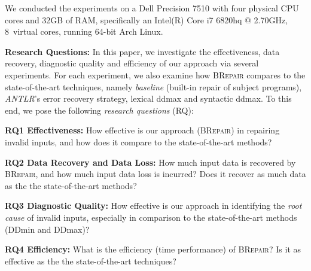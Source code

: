 \documentclass[sigconf,review,anonymous]{acmart}
\newcommand{\recheck}[1]{\textcolor{red}{#1}}
\newcommand{\revise}[1]{\textcolor{blue}{#1}}
\newcommand{\approach}{\textsc{BRepair}\xspace}
\begin{document}
We conducted the experiments on a Dell Precision 7510 
with four physical CPU cores %
and 32GB of RAM, specifically an Intel(R) Core i7 6820hq @ 2.70GHz, 8~virtual cores, running 64-bit Arch Linux.


\smallskip\noindent
\textbf{Research Questions: } 
In this paper, %
we investigate the effectiveness, data recovery, diagnostic quality and efficiency of our approach via several experiments. For each experiment, %
we also examine how \approach compares to the state-of-the-art techniques, namely \textit{baseline} (built-in repair of subject programs), \textit{ANTLR}'s error recovery strategy, lexical ddmax and syntactic ddmax.  
To this end, we pose the following \textit{research questions} (RQ):

\noindent
\textbf{RQ1 Effectiveness:}  %
How effective is our approach (\approach) in repairing invalid %
inputs, and how does it compare to the state-of-the-art methods? 

\noindent
\textbf{RQ2 Data Recovery and Data Loss:} 
How much input data is recovered by \approach, and how much input data loss is incurred?  Does it recover as much data as the 
the state-of-the-art methods?


\noindent
\textbf{RQ3 Diagnostic Quality:} 
How effective is our approach in identifying the \textit{root cause} of invalid inputs, especially in comparison to the state-of-the-art methods (DDmin and DDmax)?
%

\noindent
\textbf{RQ4 Efficiency:} %
What is the efficiency (time performance) of 
\approach? Is it as effective as the 
the state-of-the-art %
techniques?
\end{document}
